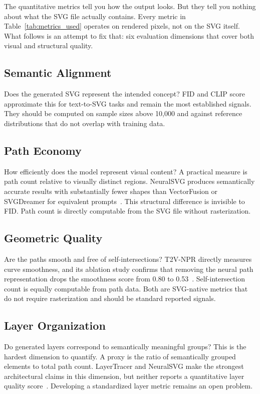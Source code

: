 The quantitative metrics tell you how the output looks. 
But they tell you nothing about what the SVG file actually contains.
Every metric in Table~\ref{tab:metrics_used} operates on rendered pixels,
not on the SVG itself. What follows is an attempt to fix that: 
six evaluation dimensions that cover both visual and structural quality.

\subsection{Semantic Alignment}
Does the generated SVG 
represent the intended concept? FID and CLIP score 
approximate this for text-to-SVG tasks and remain 
the most established signals. They should be computed 
on sample sizes above 10,000 and against reference 
distributions that do not overlap with training data.

\subsection{Path Economy}
How efficiently does the 
model represent visual content? A practical measure 
is path count relative to visually distinct regions. 
NeuralSVG produces semantically accurate results with 
substantially fewer shapes than VectorFusion or 
SVGDreamer for equivalent 
prompts~\cite{polaczekNeuralSVGImplicitRepresentation2025}. 
This structural difference is invisible to FID. Path 
count is directly computable from the SVG file without 
rasterization.

\subsection{Geometric Quality}
Are the paths smooth 
and free of self-intersections? T2V-NPR directly 
measures curve smoothness, and its ablation study 
confirms that removing the neural path representation 
drops the smoothness score from 0.80 to 
0.53~\cite{zhangTexttoVectorGenerationNeural2024}. 
Self-intersection count is equally computable from 
path data. Both are SVG-native metrics that do not 
require rasterization and should be standard 
reported signals.

\subsection{Layer Organization}
Do generated layers 
correspond to semantically meaningful groups? This 
is the hardest dimension to quantify. A proxy is 
the ratio of semantically grouped elements to total 
path count. LayerTracer and NeuralSVG make the 
strongest architectural claims in this dimension, 
but neither reports a quantitative layer quality 
score~\cite{songLayerTracerCognitiveAlignedLayered2025, polaczekNeuralSVGImplicitRepresentation2025}. 
Developing a standardized layer metric remains an open problem.

